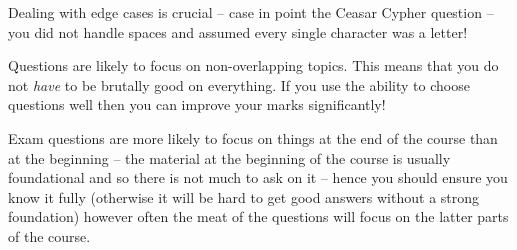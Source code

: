 \documentclass[10pt,\jkfside,a4paper]{article}
\begin{document}
Dealing with edge cases is crucial -- case in point the Ceasar Cypher question -- you did not handle spaces 
and assumed every single character was a letter!

Questions are likely to focus on non-overlapping topics. This means that you do not \textit{have} to be 
brutally good on everything. If you use the ability to choose questions well then you can improve your marks 
significantly!

Exam questions are more likely to focus on things at the end of the course than at the beginning -- 
the material at the beginning of the course is usually foundational and so there is not much to ask on it -- 
hence you should ensure you know it fully (otherwise it will be hard to get good answers without a 
strong foundation) however often the meat of the questions will focus on the latter parts of the course.
\end{document}
